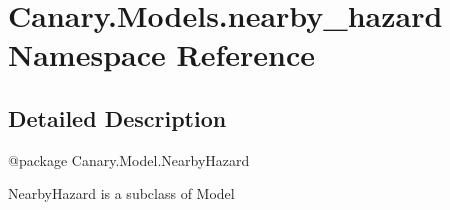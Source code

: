 \hypertarget{namespace_canary_1_1_models_1_1nearby__hazard}{\section{Canary.\-Models.\-nearby\-\_\-hazard Namespace Reference}
\label{namespace_canary_1_1_models_1_1nearby__hazard}
}


\subsection{Detailed Description}
\begin{DoxyVerb}@package Canary.Model.NearbyHazard

NearbyHazard is a subclass of Model
\end{DoxyVerb}
 